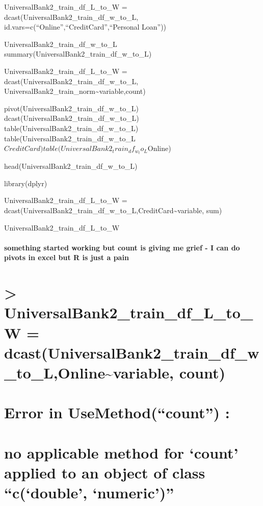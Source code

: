 \documentclass[
]{article}
\begin{document}
UniversalBank2\_train\_df\_L\_to\_W =
dcast(UniversalBank2\_train\_df\_w\_to\_L,
id.vars=c(``Online'',``CreditCard'',``Personal Loan''))

UniversalBank2\_train\_df\_w\_to\_L
summary(UniversalBank2\_train\_df\_w\_to\_L)

UniversalBank2\_train\_df\_L\_to\_W =
dcast(UniversalBank2\_train\_df\_w\_to\_L,
UniversalBank2\_train\_norm\textasciitilde variable,count)

pivot(UniversalBank2\_train\_df\_w\_to\_L)
dcast(UniversalBank2\_train\_df\_w\_to\_L)
table(UniversalBank2\_train\_df\_w\_to\_L)
table(UniversalBank2\_train\_df\_w\_to\_L\(CreditCard) table(UniversalBank2_train_df_w_to_L\)Online)

head(UniversalBank2\_train\_df\_w\_to\_L)

library(dplyr)

UniversalBank2\_train\_df\_L\_to\_W =
dcast(UniversalBank2\_train\_df\_w\_to\_L,CreditCard\textasciitilde variable,
sum)

UniversalBank2\_train\_df\_L\_to\_W

\hypertarget{something-started-working-but-count-is-giving-me-grief---i-can-do-pivots-in-excel-but-r-is-just-a-pain}{%
\paragraph{something started working but count is giving me grief - I
can do pivots in excel but R is just a
pain}\label{something-started-working-but-count-is-giving-me-grief---i-can-do-pivots-in-excel-but-r-is-just-a-pain}}

\hypertarget{universalbank2_train_df_l_to_w-dcastuniversalbank2_train_df_w_to_lonlinevariable-count}{%
\section{\textgreater{} UniversalBank2\_train\_df\_L\_to\_W =
dcast(UniversalBank2\_train\_df\_w\_to\_L,Online\textasciitilde variable,
count)}\label{universalbank2_train_df_l_to_w-dcastuniversalbank2_train_df_w_to_lonlinevariable-count}}

\hypertarget{error-in-usemethodcount}{%
\section{Error in UseMethod(``count'')
:}\label{error-in-usemethodcount}}

\hypertarget{no-applicable-method-for-count-applied-to-an-object-of-class-cdouble-numeric}{%
\section{no applicable method for `count' applied to an object of class
``c(`double',
`numeric')''}\label{no-applicable-method-for-count-applied-to-an-object-of-class-cdouble-numeric}}
\end{document}
